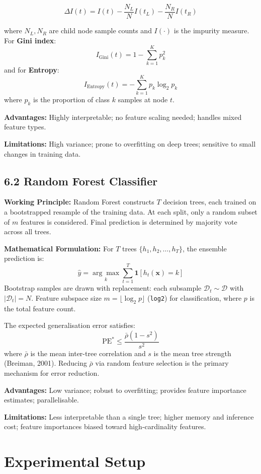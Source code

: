 \documentclass[12pt,a4paper]{article}
\begin{document}
\[
\Delta I(t) = I(t) - \frac{N_L}{N} I(t_L) - \frac{N_R}{N} I(t_R)
\]

where $N_L, N_R$ are child node sample counts and $I(\cdot)$ is the impurity measure. For
\textbf{Gini index}:
\[
I_{\text{Gini}}(t) = 1 - \sum_{k=1}^{K} p_k^2
\]
and for \textbf{Entropy}:
\[
I_{\text{Entropy}}(t) = -\sum_{k=1}^{K} p_k \log_2 p_k
\]
where $p_k$ is the proportion of class $k$ samples at node $t$.

\textbf{Advantages:} Highly interpretable; no feature scaling needed; handles mixed feature types.

\textbf{Limitations:} High variance; prone to overfitting on deep trees; sensitive to small changes
in training data.

\subsection*{6.2 Random Forest Classifier}

\textbf{Working Principle:}
Random Forest constructs $T$ decision trees, each trained on a bootstrapped resample of the
training data. At each split, only a random subset of $m$ features is considered.
Final prediction is determined by majority vote across all trees.

\textbf{Mathematical Formulation:}
For $T$ trees $\{h_1, h_2, \ldots, h_T\}$, the ensemble prediction is:
\[
\hat{y} = \underset{k}{\arg\max} \sum_{t=1}^{T} \mathbf{1}[h_t(\mathbf{x}) = k]
\]
Bootstrap samples are drawn with replacement: each subsample $\mathcal{D}_t \sim \mathcal{D}$
with $|\mathcal{D}_t| = N$. Feature subspace size $m = \lfloor \log_2 p \rfloor$ (\texttt{log2})
for classification, where $p$ is the total feature count.

The expected generalisation error satisfies:
\[
\text{PE}^* \leq \frac{\bar{\rho}(1 - s^2)}{s^2}
\]
where $\bar{\rho}$ is the mean inter-tree correlation and $s$ is the mean tree strength (Breiman, 2001).
Reducing $\bar{\rho}$ via random feature selection is the primary mechanism for error reduction.

\textbf{Advantages:} Low variance; robust to overfitting; provides feature importance estimates;
parallelisable.

\textbf{Limitations:} Less interpretable than a single tree; higher memory and inference cost;
feature importances biased toward high-cardinality features.

\section{Experimental Setup}
\end{document}
